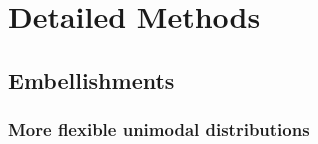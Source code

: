 \documentclass[11pt]{article}
\begin{document}



%  


% 
 
 







\section*{Detailed Methods} \label{sec:implement}

\subsection*{Embellishments} 

\subsubsection*{More flexible unimodal distributions}
\end{document}

